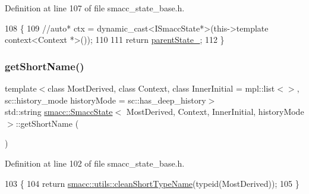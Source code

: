 Definition at line 107 of file smacc\+\_\+state\+\_\+base.\+h.


\begin{DoxyCode}
108     \{
109       \textcolor{comment}{//auto* ctx = dynamic\_cast<ISmaccState*>(this->template context<Context *>());}
110 
111       \textcolor{keywordflow}{return} \hyperlink{classsmacc_1_1ISmaccState_ad61db41d8d06a836e7d1dac7767f5695}{parentState\_};
112     \}
\end{DoxyCode}
\mbox{\label{classsmacc_1_1SmaccState_a4db028a85244653e48957d2b3371413d}} 
\subsubsection{\texorpdfstring{get\+Short\+Name()}{getShortName()}}
{\footnotesize\ttfamily template$<$class Most\+Derived, class Context, class Inner\+Initial = mpl\+::list$<$$>$, sc\+::history\+\_\+mode history\+Mode = sc\+::has\+\_\+deep\+\_\+history$>$ \\
std\+::string \hyperlink{classsmacc_1_1SmaccState}{smacc\+::\+Smacc\+State}$<$ Most\+Derived, Context, Inner\+Initial, history\+Mode $>$\+::get\+Short\+Name (\begin{DoxyParamCaption}{ }\end{DoxyParamCaption})\hspace{0.3cm}{\ttfamily [inline]}}



Definition at line 102 of file smacc\+\_\+state\+\_\+base.\+h.


\begin{DoxyCode}
103     \{
104       \textcolor{keywordflow}{return} \hyperlink{namespacesmacc_1_1utils_aacd1975bb7cd9bec4b50e111a2ae7edb}{smacc::utils::cleanShortTypeName}(\textcolor{keyword}{typeid}(MostDerived));
105     \}
\end{DoxyCode}
\mbox{\label{classsmacc_1_1SmaccState_ab7825f5db39dcbee4e4384913026d3e2}} 
